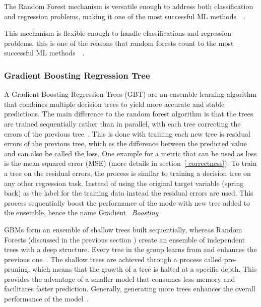 The Random Forest mechanism is versatile enough to address both classification and regression problems, making it one
of the most successful
\ac{ML} methods~\cite[p. 3--4]{biau_randomforestguided_2016}~\cite[p. 25]{breiman_randomforests_2001}.

This mechanism is flexible enough to handle classifications and regression problems,
this is one of the reasons that random forests count to the most successful \ac{ML}
methods~\cite[p. 3--4]{biau_randomforestguided_2016}~\cite[p. 25]{breiman_randomforests_2001}.

\subsubsection{Gradient Boosting Regression Tree}

A Gradient Boosting Regression Trees (\ac{GBT}) are an ensemble learning algorithm that combines multiple decision trees
to yield more accurate and stable predictions.
The main difference to the random forest algorithm is that the trees are trained sequentially rather than in parallel,
with each tree correcting the errors of the previous tree~\cite[p. 88--89]{muller_introductionmachinelearning_2016}.
This is done with training each new tree is residual errors of the previous tree, which es the
difference between the predicted value and can also be called the loss.
One example for a metric that can be used as loss is the mean squared error (MSE) (more details in section~\ref{
    correctness}).
To train a tree on the residual errors, the process is similar to training a decision tree on any other regression
task.
Instead of using the original target variable (spring back) as the label for the training data instead the
residual errors are used.
This process sequentially boost the performance of the mode with new tree added to the
ensemble, hence the name Gradient ~\textit{Boosting}~\cite[p. 222]{boehmke2019hands}



GBMs form an ensemble of shallow trees built sequentially, whereas Random Forests (discussed in the previous section
) create an ensemble of independent trees with a deep structure.
Every tree in the group learns from and enhances the previous one~\cite[p. 221]{boehmke2019hands}.
The shallow trees are achieved through a process called pre-pruning, which means that the growth of a tree is halted
at a specific depth.
This provides the advantage of a smaller model that consumes less memory and facilitates faster prediction.
Generally, generating more trees enhances the overall performance of the
model~\cite[p. 88--89]{muller_introductionmachinelearning_2016}.

